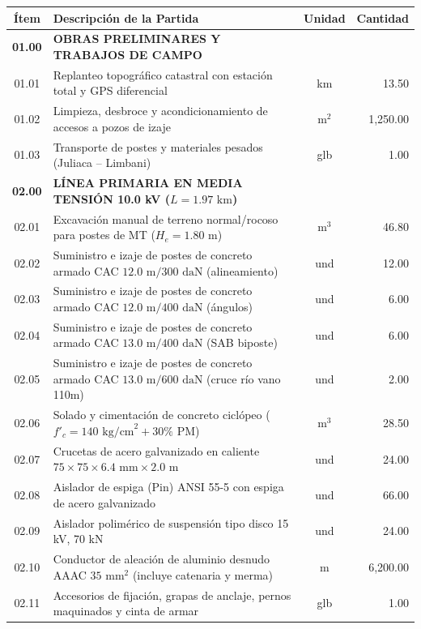 \begin{table}[H]
\centering
\scriptsize
\begin{tabular}{|c|l|c|r|}
\hline
\textbf{Ítem} & \textbf{Descripción de la Partida} & \textbf{Unidad} & \textbf{Cantidad} \\
\hline
\textbf{01.00} & \textbf{OBRAS PRELIMINARES Y TRABAJOS DE CAMPO} & & \\
01.01 & Replanteo topográfico catastral con estación total y GPS diferencial & km & 13.50 \\
01.02 & Limpieza, desbroce y acondicionamiento de accesos a pozos de izaje & m$^2$ & 1,250.00 \\
01.03 & Transporte de postes y materiales pesados (Juliaca -- Limbani) & glb & 1.00 \\
\hline
\textbf{02.00} & \textbf{LÍNEA PRIMARIA EN MEDIA TENSIÓN 10.0 kV ($L = 1.97\text{ km}$)} & & \\
02.01 & Excavación manual de terreno normal/rocoso para postes de MT ($H_e = 1.80\text{ m}$) & m$^3$ & 46.80 \\
02.02 & Suministro e izaje de postes de concreto armado CAC $12.0\text{ m} / 300\text{ daN}$ (alineamiento) & und & 12.00 \\
02.03 & Suministro e izaje de postes de concreto armado CAC $12.0\text{ m} / 400\text{ daN}$ (ángulos) & und & 6.00 \\
02.04 & Suministro e izaje de postes de concreto armado CAC $13.0\text{ m} / 400\text{ daN}$ (SAB biposte) & und & 6.00 \\
02.05 & Suministro e izaje de postes de concreto armado CAC $13.0\text{ m} / 600\text{ daN}$ (cruce río vano 110m) & und & 2.00 \\
02.06 & Solado y cimentación de concreto ciclópeo ($f'_c = 140\text{ kg/cm}^2 + 30\%$ PM) & m$^3$ & 28.50 \\
02.07 & Crucetas de acero galvanizado en caliente $75 \times 75 \times 6.4\text{ mm} \times 2.0\text{ m}$ & und & 24.00 \\
02.08 & Aislador de espiga (Pin) ANSI 55-5 con espiga de acero galvanizado & und & 66.00 \\
02.09 & Aislador polimérico de suspensión tipo disco 15 kV, 70 kN & und & 24.00 \\
02.10 & Conductor de aleación de aluminio desnudo AAAC $35\text{ mm}^2$ (incluye catenaria y merma) & m & 6,200.00 \\
02.11 & Accesorios de fijación, grapas de anclaje, pernos maquinados y cinta de armar & glb & 1.00 \\

\end{tabular}
\end{table}

